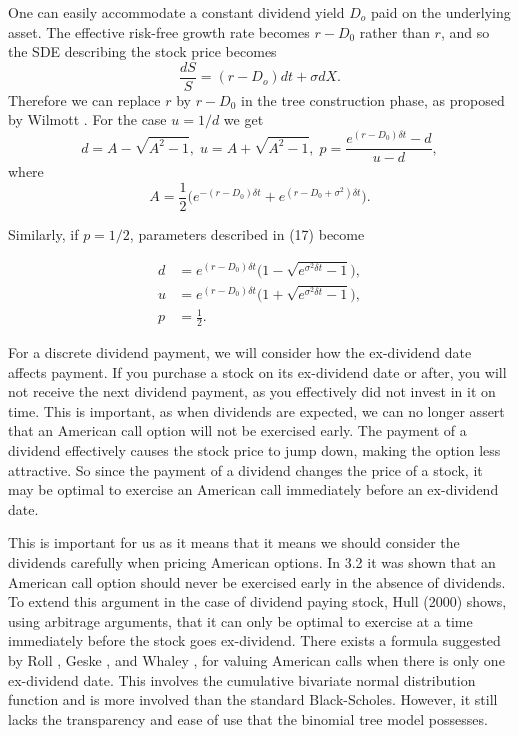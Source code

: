 \documentclass[letterpaper,12pt]{article}
\theoremstyle{plain}
\numberwithin{equation}{section}
\begin{document}
One can easily accommodate a constant dividend yield $D_o$ paid on the underlying asset. The effective risk-free growth rate becomes $r-D_0$ rather than $r$, and so the SDE describing the stock price becomes
\begin{equation*}
	\frac{dS}{S} = (r-D_o)dt + \sigma dX.
\end{equation*}
Therefore we can replace $r$ by $r-D_0$ in the tree construction phase, as proposed by Wilmott \cite{MFD}. For the case $u=1/d$ we get
\begin{equation}
	d = A - \sqrt{A^2 - 1}, \;	u = A + \sqrt{A^2 - 1}, \; p = \frac{e^{(r-D_0)\delta t} - d}{u-d},
\end{equation}
where
\begin{equation*}
	A = \frac{1}{2}\bigg( e^{-(r-D_0)\delta t} + e^{(r -D_0+ \sigma^2)\delta t}\bigg).
\end{equation*}

Similarly, if $p = 1/2$, parameters described in (17) become 

\begin{equation}
	\begin{aligned}
	d & = e^{(r-D_0)\delta t}\big(1 -\sqrt{e^{\sigma^2\delta t}-1} \big),\\
	u & = e^{(r-D_0)\delta t}\big(1 +\sqrt{e^{\sigma^2\delta t}-1} \big),\\
	p &= \frac{1}{2}.
	\end{aligned}
\end{equation}



For a discrete dividend payment, we will consider how the ex-dividend date affects payment. If you purchase a stock on its ex-dividend date or after, you will not receive the next dividend payment, as you effectively did not invest in it on time. This is important, as when dividends are expected, we can no longer assert that an American call option will not be exercised early. The payment of a dividend effectively causes the stock price to jump down, making the option less attractive. So since the payment of a dividend changes the price of a stock, it may be optimal to exercise an American call immediately before an ex-dividend date. 

This is important for us as it means that it means we should consider the dividends carefully when pricing American options. In 3.2 it was shown that an American call option should never be exercised early in the absence of dividends. To extend this argument in the case of dividend paying stock, Hull (2000) shows, using arbitrage arguments, that it can only be optimal to exercise at a time immediately before the stock goes ex-dividend. There exists a formula suggested by Roll \cite{ROLL}, Geske \cite{GESK}, and Whaley \cite{SKD}, for valuing American calls when there is only one ex-dividend date. This involves the cumulative bivariate normal distribution function and is more involved than the standard Black-Scholes. However, it still lacks the transparency and ease of use that the binomial tree model possesses.
\end{document}
